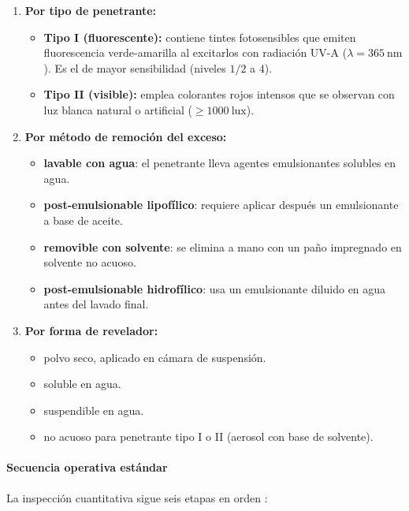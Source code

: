 \begin{enumerate}
  \item \textbf{Por tipo de penetrante:}
  \begin{itemize}
    \item \textbf{Tipo I (fluorescente):} contiene tintes fotosensibles que emiten
          fluorescencia verde-amarilla al excitarlos con radiación UV-A
          ($\lambda = 365\ \text{nm}$). Es el de mayor sensibilidad (niveles
          $1/2$ a $4$).
    \item \textbf{Tipo II (visible):} emplea colorantes rojos intensos que se
          observan con luz blanca natural o artificial ($\ge 1000\ \text{lux}$).
  \end{itemize}
  \item \textbf{Por método de remoción del exceso:}
  \begin{itemize}
    \item \textbf{lavable con agua}: el penetrante lleva agentes emulsionantes
          solubles en agua.
    \item \textbf{post-emulsionable lipofílico}: requiere aplicar después un
          emulsionante a base de aceite.
    \item \textbf{removible con solvente}: se elimina a mano con un paño impregnado
          en solvente no acuoso.
    \item \textbf{post-emulsionable hidrofílico}: usa un emulsionante diluido en agua
          antes del lavado final.
  \end{itemize}
  \item \textbf{Por forma de revelador:}
  \begin{itemize}
    \item polvo seco, aplicado en cámara de suspensión.
    \item soluble en agua.
    \item suspendible en agua.
    \item no acuoso para penetrante tipo I o II (aerosol con base de solvente).
  \end{itemize}
\end{enumerate}

\paragraph{Secuencia operativa estándar}

La inspección cuantitativa sigue seis etapas en orden \parencite{astm_e165}:

